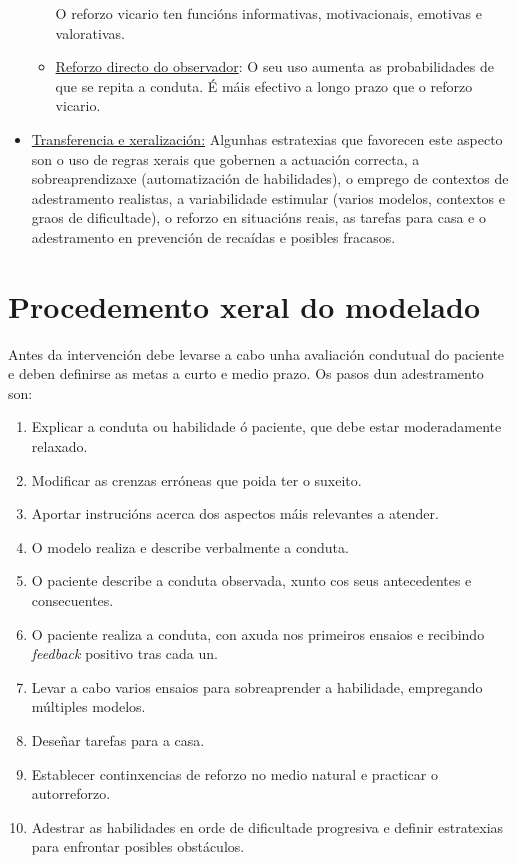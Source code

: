 \documentclass[a4paper,11pt]{article}
\begin{document}
\begin{itemize}
\begin{itemize}
		O reforzo vicario ten funcións informativas, motivacionais, emotivas e valorativas.
		\item \underline{Reforzo directo do observador}: O seu uso aumenta as probabilidades de que 
		se repita a conduta. É máis efectivo a longo prazo que o reforzo vicario.
	\end{itemize}
	\item \underline{Transferencia e xeralización:} Algunhas estratexias que favorecen este aspecto 
	son o uso de regras xerais que gobernen a actuación correcta, a sobreaprendizaxe (automatización 
	de habilidades), o emprego de contextos de adestramento realistas, a variabilidade estimular 
	(varios modelos, contextos e graos de dificultade), o reforzo en situacións reais, as tarefas 
	para casa e o adestramento en prevención de recaídas e posibles fracasos.
\end{itemize}

\section{Procedemento xeral do modelado}
Antes da intervención debe levarse a cabo unha avaliación condutual do paciente e deben definirse as metas a curto e medio prazo. Os pasos dun adestramento son:
\begin{enumerate}
	\item Explicar a conduta ou habilidade ó paciente, que debe estar moderadamente relaxado.
	\item Modificar as crenzas erróneas que poida ter o suxeito.
	\item Aportar instrucións acerca dos aspectos máis relevantes a atender.
	\item O modelo realiza e describe verbalmente a conduta.
	\item O paciente describe a conduta observada, xunto cos seus antecedentes e consecuentes.
	\item O paciente realiza a conduta, con axuda nos primeiros ensaios e recibindo \textit{feedback}
	positivo tras cada un.
	\item Levar a cabo varios ensaios para sobreaprender a habilidade, empregando múltiples modelos.
	\item Deseñar tarefas para a casa.
	\item Establecer continxencias de reforzo no medio natural e practicar o autorreforzo.
	\item Adestrar as habilidades en orde de dificultade progresiva e definir estratexias para 
	enfrontar posibles obstáculos.
\end{enumerate}
\end{document}
